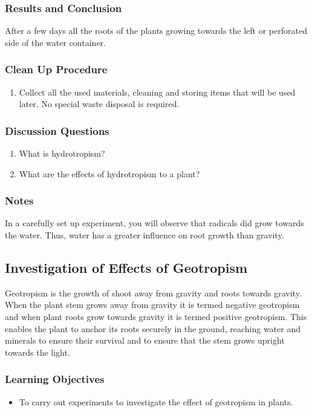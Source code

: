 \subsubsection*{Results and Conclusion}
After a few days all the roots of the plants growing towards the left or perforated side of the water container.

\subsubsection*{Clean Up Procedure}
\begin{enumerate}
\item{ Collect all the used materials, cleaning and storing items that will be used later. No special waste disposal is required.}
\end{enumerate}

\subsubsection*{Discussion Questions}
\begin{enumerate}
\item{What is hydrotropism?}
\item{What are the effects of hydrotropism to a plant?}
\end{enumerate}

\subsubsection*{Notes}
In a carefully set up experiment, you will observe that radicals did grow towards the water.  Thus, water has a greater influence on root growth than gravity.

\subsection{Investigation of Effects of Geotropism}
Geotropism is the growth of shoot away from gravity and roots towards gravity. When the plant stem grows away from gravity it is termed negative geotropism and when plant roots grow towards gravity it is termed positive geotropism. This enables the plant to anchor its roots securely in the ground, reaching water and minerals to ensure their survival and to ensure that the stem grows upright towards the light.

\subsubsection*{Learning Objectives}
\begin{itemize}
\item{To carry out experiments to investigate the effect of geotropism in plants.}
\end{itemize}

